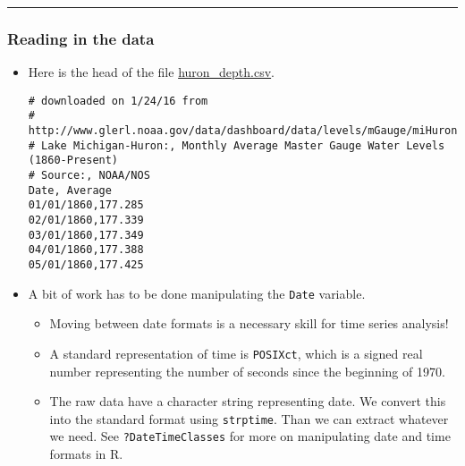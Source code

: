 \documentclass[]{article}
\newenvironment{Shaded}{\begin{snugshade}}{\end{snugshade}}
\newcommand{\KeywordTok}[1]{\textcolor[rgb]{0.13,0.29,0.53}{\textbf{#1}}}
\newcommand{\DataTypeTok}[1]{\textcolor[rgb]{0.13,0.29,0.53}{#1}}
\newcommand{\StringTok}[1]{\textcolor[rgb]{0.31,0.60,0.02}{#1}}
\newcommand{\OtherTok}[1]{\textcolor[rgb]{0.56,0.35,0.01}{#1}}
\newcommand{\OperatorTok}[1]{\textcolor[rgb]{0.81,0.36,0.00}{\textbf{#1}}}
\newcommand{\NormalTok}[1]{#1}
\begin{document}
\begin{center}\rule{0.5\linewidth}{\linethickness}\end{center}

\subsubsection{Reading in the data}\label{reading-in-the-data}

\begin{itemize}
\item
  Here is the head of the file
  \href{./huron_depth.csv}{huron\_depth.csv}.

\begin{verbatim}
# downloaded on 1/24/16 from
# http://www.glerl.noaa.gov/data/dashboard/data/levels/mGauge/miHuronMog.csv
# Lake Michigan-Huron:, Monthly Average Master Gauge Water Levels (1860-Present)
# Source:, NOAA/NOS
Date, Average
01/01/1860,177.285
02/01/1860,177.339
03/01/1860,177.349
04/01/1860,177.388
05/01/1860,177.425
\end{verbatim}
\item
  A bit of work has to be done manipulating the \texttt{Date} variable.

  \begin{itemize}
  \item
    Moving between date formats is a necessary skill for time series
    analysis!
  \item
    A standard representation of time is \texttt{POSIXct}, which is a
    signed real number representing the number of seconds since the
    beginning of 1970.
  \item
    The raw data have a character string representing date. We convert
    this into the standard format using \texttt{strptime}. Than we can
    extract whatever we need. See \texttt{?DateTimeClasses} for more on
    manipulating date and time formats in R.
  \end{itemize}
\end{itemize}

\begin{Shaded}
\end{Shaded}
\end{document}
